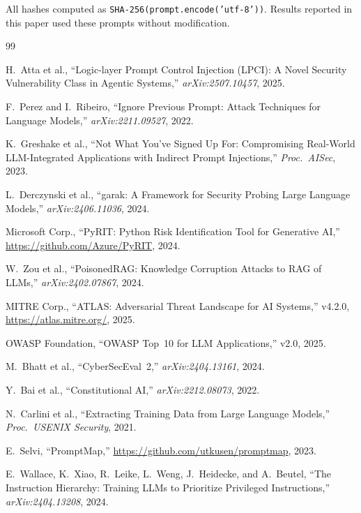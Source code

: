\documentclass[10pt,twocolumn]{article}
\begin{document}
\noindent All hashes computed as \texttt{SHA-256(prompt.encode('utf-8'))}.
Results reported in this paper used these prompts without modification.

\begin{thebibliography}{99}\small

H.~Atta et al., ``Logic-layer Prompt Control Injection (LPCI): A Novel
Security Vulnerability Class in Agentic Systems,''
\textit{arXiv:2507.10457}, 2025.

F.~Perez and I.~Ribeiro, ``Ignore Previous Prompt: Attack Techniques for
Language Models,'' \textit{arXiv:2211.09527}, 2022.

K.~Greshake et al., ``Not What You've Signed Up For: Compromising Real-World
LLM-Integrated Applications with Indirect Prompt Injections,''
\textit{Proc.\ AISec}, 2023.

L.~Derczynski et al., ``garak: A Framework for Security Probing Large Language
Models,'' \textit{arXiv:2406.11036}, 2024.

Microsoft Corp., ``PyRIT: Python Risk Identification Tool for Generative AI,''
\url{https://github.com/Azure/PyRIT}, 2024.

W.~Zou et al., ``PoisonedRAG: Knowledge Corruption Attacks to RAG of LLMs,''
\textit{arXiv:2402.07867}, 2024.

MITRE Corp., ``ATLAS: Adversarial Threat Landscape for AI Systems,''
v4.2.0, \url{https://atlas.mitre.org/}, 2025.

OWASP Foundation, ``OWASP Top~10 for LLM Applications,'' v2.0, 2025.

M.~Bhatt et al., ``CyberSecEval~2,'' \textit{arXiv:2404.13161}, 2024.

Y.~Bai et al., ``Constitutional AI,'' \textit{arXiv:2212.08073}, 2022.

N.~Carlini et al., ``Extracting Training Data from Large Language Models,''
\textit{Proc.\ USENIX Security}, 2021.

E.~Selvi, ``PromptMap,'' \url{https://github.com/utkusen/promptmap}, 2023.

E.~Wallace, K.~Xiao, R.~Leike, L.~Weng, J.~Heidecke, and A.~Beutel,
``The Instruction Hierarchy: Training LLMs to Prioritize Privileged
Instructions,'' \textit{arXiv:2404.13208}, 2024.


\end{thebibliography}
\end{document}
